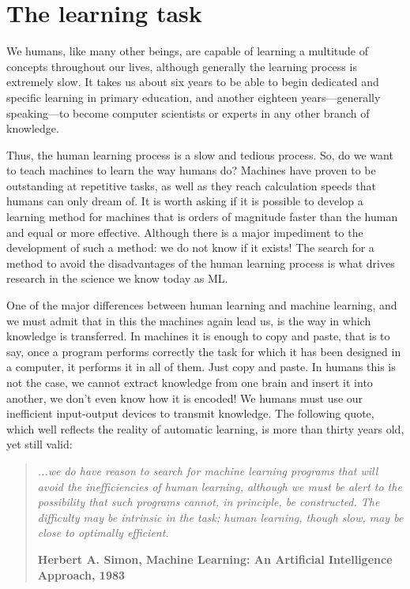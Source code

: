 \section{The learning task}

We humans, like many other beings, are capable of learning a multitude of concepts throughout our lives, although generally the learning process is extremely slow. It takes us about six years to be able to begin dedicated and specific learning in primary education, and another eighteen years---generally speaking---to become computer scientists or experts in any other branch of knowledge.

Thus, the human learning process is a slow and tedious process. So, do we want to teach machines to learn the way humans do? Machines have proven to be outstanding at repetitive tasks, as well as they reach calculation speeds that humans can only dream of. It is worth asking if it is possible to develop a learning method for machines that is orders of magnitude faster than the human and equal or more effective. Although there is a major impediment to the development of such a method: we do not know if it exists! The search for a method to avoid the disadvantages of the human learning process is what drives research in the science we know today as \acf{ML}. 

One of the major differences between human learning and machine learning, and we must admit that in this the machines again lead us, is the way in which knowledge is transferred. In machines it is enough to copy and paste, that is to say, once a program performs correctly the task for which it has been designed in a computer, it performs it in all of them. Just copy and paste. In humans this is not the case, we cannot extract knowledge from one brain and insert it into another, we don't even know how it is encoded! We humans must use our inefficient input-output devices to transmit knowledge. The following quote, which well reflects the reality of automatic learning, is more than thirty years old, yet still valid:

\begin{quotation}{\slshape
		...we do have reason to search for machine learning programs that will avoid the inefficiencies of human learning, although we must be alert to the possibility that such programs cannot, in principle, be constructed. The difficulty may be intrinsic in the task; human learning, though slow, may be close to optimally efficient.}
	\begin{flushright}
		\textbf{Herbert A. Simon, Machine Learning: An Artificial Intelligence Approach, 1983} 
	\end{flushright}
\end{quotation}

